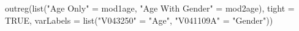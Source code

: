 \begin{Schunk}
\begin{Sinput}
  outreg(list("Age Only" = mod1age, "Age With Gender" = mod2age), tight = TRUE, varLabels = list("V043250" = "Age", "V041109A" = "Gender")) 
\end{Sinput}
\end{Schunk}
